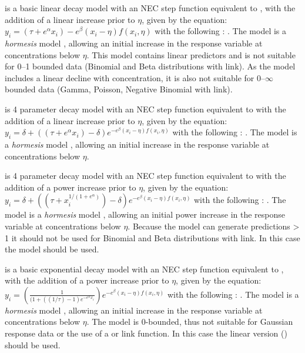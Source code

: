 \documentclass[
  shortnames]{jss}
\begin{document}
 is a basic linear decay model with an NEC step function equivalent to , with the addition of a linear increase prior to \(\eta\), given by the equation:
\(y_i = (\tau + e^{\alpha} x_i) - e^{\beta} \left(x_i - \eta \right) f(x_i, \eta)\)
with the following : . The  model is a \emph{hormesis} model \citep{Mattson2008}, allowing an initial increase in the response variable at concentrations below \(\eta\). This model contains linear predictors and is not suitable for 0--1 bounded data (Binomial and Beta distributions with  link). As the model includes a linear decline with concentration, it is also not suitable for 0--\(\infty\) bounded data (Gamma, Poisson, Negative Binomial with  link).

 is 4 parameter decay model with an NEC step function equivalent to  with the addition of a linear increase prior to \(\eta\), given by the equation:
\(y_i = \delta + ((\tau + e^{\alpha} x_i) - \delta ) e^{-e^{\beta} \left(x_i - \eta \right) f(x_i, \eta)}\)
with the following : . The  model is a \emph{hormesis} model \citep{Mattson2008}, allowing an initial increase in the response variable at concentrations below \(\eta\).

 is 4 parameter decay model with an NEC step function equivalent to  with the addition of a power increase prior to \(\eta\), given by the equation:
\(y_i = \delta + ((\tau + x_i^{1/(1+e^{\alpha})}) - \delta) e^{-e^{\beta} \left(x_i - \eta \right) f(x_i, \eta)}\)
with the following : . The  model is a \emph{hormesis} model \citep{Mattson2008}, allowing an initial power increase in the response variable at concentrations below \(\eta\). Because the model can generate predictions \textgreater{} 1 it should not be used for Binomial and Beta distributions with  link. In this case the  model should be used.

 is a basic exponential decay model with an NEC step function equivalent to , with the addition of a power increase prior to \(\eta\), given by the equation:
\(y_i = \left(\frac{1}{(1 + ((1/\tau)-1) e^{-e^{\alpha}x_i}}\right) e^{-e^{\beta} \left(x_i - \eta \right) f(x_i, \eta)}\)
with the following : . The  model is a \emph{hormesis} model \citep{Mattson2008}, allowing an initial increase in the response variable at concentrations below \(\eta\). The model is 0-bounded, thus not suitable for Gaussian response data or the use of a  or  link function. In this case the linear version () should be used.
\end{document}
